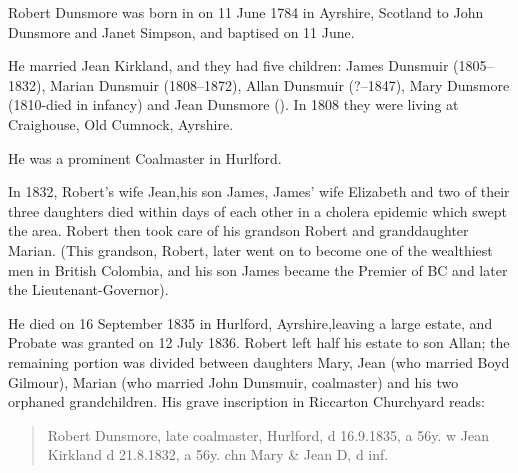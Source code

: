 
Robert Dunsmore was born in on 11 June 1784 in Ayrshire, Scotland to John Dunsmore and Janet Simpson, and baptised on 11 June.  

He married Jean Kirkland, and they had five children: James Dunsmuir (1805--1832), Marian Dunsmuir (1808--1872), 
Allan Dunsmuir (?--1847), Mary Dunsmore (1810-died in infancy) and Jean Dunsmore (). In 1808 they were living at Craighouse, Old Cumnock, Ayrshire. \cite{RDunsmore1808}

He was a prominent Coalmaster in Hurlford. 

In 1832, Robert's wife Jean,his son James, James' wife Elizabeth and two of their three daughters died within days of each other in a cholera epidemic which swept the area. Robert then took care of his grandson Robert and granddaughter Marian. (This grandson, Robert, later went on to become one of the wealthiest men in British Colombia, and his son James became the Premier of BC and later the Lieutenant-Governor). 

He died on 16 September 1835 in Hurlford, Ayrshire,leaving a large estate,  and Probate was granted on 12 July 1836.\cite{RDunsmoreWill} Robert left half his estate to son Allan; the remaining portion was divided between daughters Mary, Jean (who married Boyd Gilmour), Marian (who married John Dunsmuir, coalmaster) and his two orphaned grandchildren.  His grave inscription in Riccarton Churchyard reads:

\begin{quotation}
Robert Dunsmore, late coalmaster, Hurlford, d 16.9.1835, a 56y. w Jean Kirkland d 21.8.1832, a 56y. chn Mary \& Jean D, d inf.
\end{quotation}

